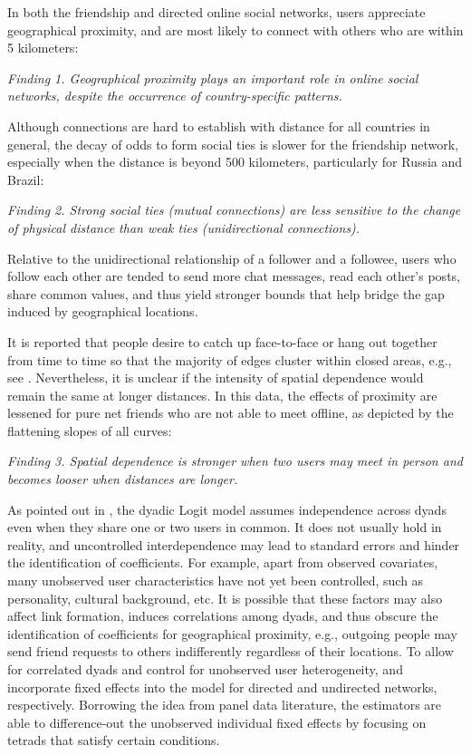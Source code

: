 In both the friendship and directed online social networks, users appreciate geographical proximity, and are most likely to connect with others who are within 5 kilometers:

\textit{Finding 1. Geographical proximity plays an important role in online social networks, despite the occurrence of country-specific patterns. }

Although connections are hard to establish with distance for all countries in general, the decay of odds to form social ties is slower for the friendship network, especially when the distance is beyond 500 kilometers, particularly for Russia and Brazil:

\textit{Finding 2. Strong social ties (mutual connections) are less sensitive to the change of physical distance than weak ties (unidirectional connections). }

Relative to the unidirectional relationship of a follower and a followee, users who follow each other are tended to send more chat messages, read each other's posts, share common values, and thus yield stronger bounds that help bridge the gap induced by geographical locations.

It is reported that people desire to catch up face-to-face or hang out together from time to time so that the majority of edges cluster within closed areas, e.g., see \cite{ugander2011anatomy, ellison2006spatially}. Nevertheless, it is unclear if the intensity of spatial dependence would remain the same at longer distances. In this data, the effects of proximity are lessened for pure net friends who are not able to meet offline, as depicted by the flattening slopes of all curves:

\textit{Finding 3. Spatial dependence is stronger when two users may meet in person and becomes looser when distances are longer. }

As pointed out in \cite{graham2020dyadic}, the dyadic Logit model assumes independence across dyads even when they share one or two users in common. It does not usually hold in reality, and uncontrolled interdependence may lead to standard errors and hinder the identification of coefficients. For example, apart from observed covariates, many unobserved user characteristics have not yet been controlled, such as personality, cultural background, etc. It is possible that these factors may also affect link formation, induces correlations among dyads, and thus obscure the identification of coefficients for geographical proximity, e.g., outgoing people may send friend requests to others indifferently regardless of their locations. To allow for correlated dyads and control for unobserved user heterogeneity, \cite{charbonneau2017multiple} and \cite{graham2017econometric} incorporate fixed effects into the model for directed and undirected networks, respectively. Borrowing the idea from panel data literature, the estimators are able to difference-out the unobserved individual fixed effects by focusing on tetrads that satisfy certain conditions.

